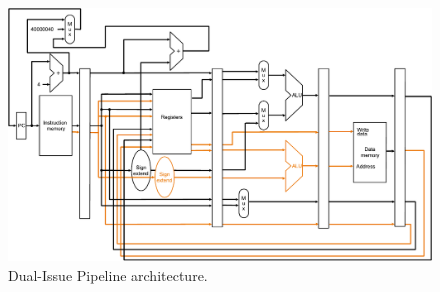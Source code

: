 \begin{figure}[!htp]
    \centering
    \includegraphics[width=\textwidth]{img/dual-issue-architecture.pdf}
    \caption{Dual-Issue Pipeline architecture.}
\end{figure}

